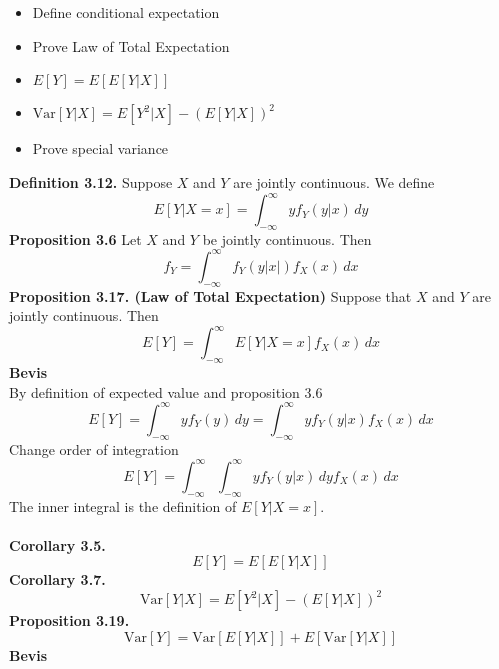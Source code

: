 \documentclass[12pt,a4paper]{report}
\author{Frederik Appel Vardinghus-Nielsen}
\begin{document}
\\\\
\begin{itemize}
\setlength\itemsep{0em}
\item Define conditional expectation
\item Prove Law of Total Expectation
\item $E[Y]=E[E[Y|X]]$
\item $\text{Var}[Y|X]=E[Y^2|X]-(E[Y|X])^2$
\item Prove special variance
\end{itemize}
\textbf{Definition 3.12.} Suppose $X$ and $Y$ are jointly continuous. We define
\begin{equation}
E[Y|X=x]=\int_{-\infty}^{\infty}\!yf_Y(y|x)\,dy
\end{equation}
\textbf{Proposition 3.6} Let $X$ and $Y$ be jointly continuous. Then
\begin{equation}
f_Y=\int_{-\infty}^{\infty}\!f_Y(y|x|)f_X(x)\,dx
\end{equation}
\textbf{Proposition 3.17. (Law of Total Expectation)} Suppose that $X$ and $Y$ are jointly continuous. Then
\begin{equation}
E[Y]=\int_{-\infty}^{\infty}E[Y|X=x]f_X(x)\,dx
\end{equation}
\textbf{Bevis}\\
By definition of expected value and proposition 3.6
\begin{equation}
E[Y]=\int_{-\infty}^{\infty}\!yf_Y(y)\,dy=\int_{-\infty}^{\infty}\!yf_Y(y|x)f_X(x)\,dx
\end{equation}
Change order of integration
\begin{equation}
E[Y]=\int_{-\infty}^{\infty}\!\int_{-\infty}^{\infty}\!yf_Y(y|x)\,dyf_X(x)\,dx
\end{equation}
The inner integral is the definition of $E[Y|X=x]$.\\\\
\textbf{Corollary 3.5.}
\begin{equation}
E[Y]=E\left[E[Y|X]\right]
\end{equation}
\textbf{Corollary 3.7.}
\begin{equation}
\text{Var}[Y|X]=E[Y^2|X]-(E[Y|X])^2
\end{equation}
\textbf{Proposition 3.19.}
\begin{equation}
\text{Var}[Y]=\text{Var}[E[Y|X]]+E[\text{Var}[Y|X]]
\end{equation}
\textbf{Bevis}\\
\end{document}
